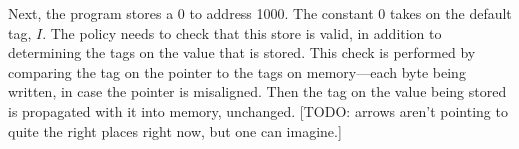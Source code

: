\documentclass{llncs}
\begin{document}
  

  



  




Next, the program stores a 0 to address 1000. The constant 0
takes on the default tag, \(I\). The policy needs to check that
this store is valid, in addition to determining the tags on the value that is stored.
This check is performed by comparing the tag on the pointer to the tags on memory---each
byte being written, in case the pointer is misaligned. Then the tag on the value being stored
is propagated with it into memory, unchanged.
[TODO: arrows aren't pointing to quite the right places right now, but one can imagine.]
\end{document}
